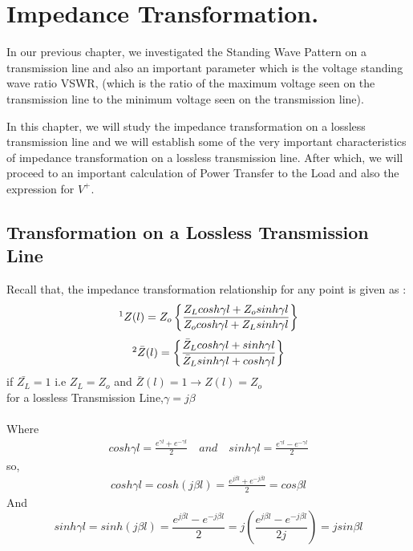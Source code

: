 \chapter{Impedance Transformation.}
In our previous chapter, we investigated the Standing Wave Pattern on a transmission line and also an important parameter which is the voltage standing wave ratio VSWR, (which is the ratio of the maximum voltage seen on the transmission line to the minimum voltage seen on the transmission line).

In this chapter, we will study the impedance transformation on a lossless
transmission line and we will establish some of the very important characteristics of impedance transformation on a lossless transmission line. After which, we will proceed to an important calculation of Power Transfer to the Load and also the expression for $V^{+}$.
\section{Transformation on a Lossless Transmission Line}
Recall that, the impedance transformation relationship for any point is given as :
\begin{align*}
\footnotemark[1]Z(l) = Z_o\left\lbrace \frac{Z_Lcosh\gamma l + Z_osinh\gamma l}{Z_ocosh\gamma l + Z_Lsinh\gamma l}\right\rbrace 
\end{align*}
\begin{align*}
\footnotemark[2]\bar{Z}(l) = \left\lbrace \frac{\bar{Z}_Lcosh\gamma l + sinh\gamma l}{\bar{Z}_Lsinh\gamma l + cosh\gamma l}\right\rbrace 
\end{align*}
if $\bar{Z_L} = 1$ i.e $Z_L = Z_o$ and $\bar{Z}(l) = 1 \rightarrow  Z(l) = Z_o$\\
for a lossless Transmission Line,$\gamma=j\beta$\\\\
Where
\begin{align*}
cosh\gamma l = \frac{e^{\gamma l} + e^{-\gamma l}}{2} \quad and \quad sinh\gamma l = \frac{e^{\gamma l} - e^{-\gamma l}}{2}
\end{align*}
so,
\begin{align*}
cosh\gamma l= cosh(j\beta l)=\frac{e^{j \beta l} + e^{-j \beta l}}{2}=cos\beta l
\end{align*}
And
\begin{dmath*}
sinh\gamma l=sinh(j \beta l) = \frac{e^{j \beta l} - e^{-j \beta l}}{2}=j\left( \frac{e^{j \beta l} - e^{-j \beta l}}{2j}\right) =jsin\beta l
\end{dmath*}

